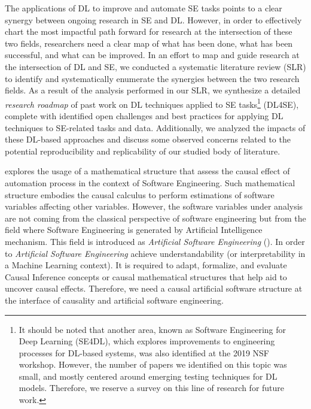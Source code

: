 The applications of DL to improve and automate SE tasks points to a clear synergy between ongoing research in SE and DL. However, in order to effectively chart the most impactful path forward for research at the intersection of these two fields, researchers need a clear map of what has been done, what has been successful, and what can be improved. %
In an effort to map and guide research at the intersection of DL and SE, we conducted a systematic literature review (SLR) to identify and systematically enumerate the synergies between the two research fields. As a result of the analysis performed in our SLR, we synthesize a detailed \textit{research roadmap} of past work on DL techniques applied to SE tasks\footnote{It should be noted that another area, known as Software Engineering for Deep Learning (SE4DL), which explores improvements to engineering processes for DL-based systems, was also identified at the 2019 NSF workshop. However, the number of papers we identified on this topic was small, and mostly centered around emerging testing techniques for DL models. Therefore, we reserve a survey on this line of research for future work.} (\ie DL4SE), complete with identified open challenges and best practices for applying DL techniques to SE-related tasks and data. Additionally, we analyzed the impacts of these DL-based approaches and discuss some observed concerns related to the potential reproducibility and replicability of our studied body of literature. %


 explores the usage of a mathematical structure that assess the causal effect of automation process in the context of Software Engineering. Such mathematical structure embodies the causal calculus to perform estimations of software variables affecting other variables. However, the software variables under analysis are not coming from the classical perspective of software engineering but from the field where Software Engineering is generated by Artificial Intelligence mechanism. This field is introduced as \textit{Artificial Software Engineering} (\asofte). In order to \textit{Artificial Software Engineering} achieve understandability (or interpretability in a Machine Learning context). It is required to adapt, formalize, and evaluate Causal Inference concepts or causal mathematical structures that help aid to uncover causal effects. Therefore, we need a causal artificial software structure at the interface of causality and artificial software engineering.  

